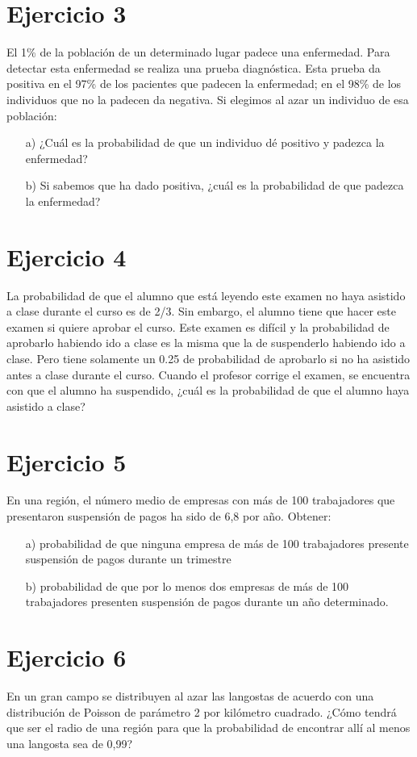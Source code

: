 \documentclass[fleqn]{article}
\begin{document}
	\section{Ejercicio 3}
	El 1\% de la población de un determinado lugar padece una enfermedad. Para detectar esta enfermedad se
	realiza una prueba diagnóstica. Esta prueba da positiva en el 97\% de los pacientes que padecen la enfermedad;
	en el 98\% de los individuos que no la padecen da negativa. Si elegimos al azar un individuo de esa población:
	\begin{enumerate}
		\item[a)]¿Cuál es la probabilidad de que un individuo dé positivo y padezca la enfermedad?
		\item[b)]Si sabemos que ha dado positiva, ¿cuál es la probabilidad de que padezca la enfermedad?
	\end{enumerate}
	\section{Ejercicio 4}
	La probabilidad de que el alumno que está leyendo este examen no haya asistido a clase durante el curso es
	de 2/3. Sin embargo, el alumno tiene que hacer este examen si quiere aprobar el curso. Este examen es difícil
	y la probabilidad de aprobarlo habiendo ido a clase es la misma que la de suspenderlo habiendo ido a clase.
	Pero tiene solamente un 0.25 de probabilidad de aprobarlo si no ha asistido antes a clase durante el curso.
	Cuando el profesor corrige el examen, se encuentra con que el alumno ha suspendido, ¿cuál es la probabilidad
	de que el alumno haya asistido a clase?
	\section{Ejercicio 5}
	En una región, el número medio de empresas con más de 100 trabajadores que presentaron suspensión de pagos ha sido de 6,8 por año. Obtener:
	\begin{enumerate}
		\item[a)] probabilidad de que ninguna empresa de más de 100 trabajadores presente suspensión de pagos durante un trimestre
		\item[b)] probabilidad de que por lo menos dos empresas de más de 100 trabajadores presenten suspensión de pagos durante un año determinado.
	\end{enumerate}
	\section{Ejercicio 6}
	En un gran campo se distribuyen al azar las langostas de acuerdo con una distribución de Poisson de parámetro 2 por kilómetro cuadrado. ¿Cómo tendrá que ser el radio de una región para que la probabilidad de encontrar allí al menos una langosta sea de 0,99?
\end{document}
